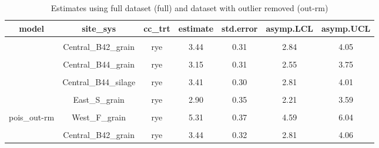 \documentclass[
]{article}
\begin{document}
\begin{table}[H]

\caption{\label{tab:estimates}Estimates using full dataset (full) and dataset with outlier removed (out-rm)}
\centering
\begin{tabular}[t]{ccccccc}
\toprule
model & site\_sys & cc\_trt & estimate & std.error & asymp.LCL & asymp.UCL\\
\midrule
\cellcolor{gray!6}{pois\_out-rm} & \cellcolor{gray!6}{Central\_B42\_grain} & \cellcolor{gray!6}{no} & \cellcolor{gray!6}{2.59} & \cellcolor{gray!6}{0.32} & \cellcolor{gray!6}{1.97} & \cellcolor{gray!6}{3.21}\\
 & \multirow{-2}{*}{\centering\arraybackslash Central\_B42\_grain} & rye & 3.44 & 0.31 & 2.84 & 4.05\\

\cellcolor{gray!6}{pois\_out-rm} & \cellcolor{gray!6}{Central\_B44\_grain} & \cellcolor{gray!6}{no} & \cellcolor{gray!6}{3.33} & \cellcolor{gray!6}{0.31} & \cellcolor{gray!6}{2.73} & \cellcolor{gray!6}{3.93}\\
 & \multirow{-2}{*}{\centering\arraybackslash Central\_B44\_grain} & rye & 3.15 & 0.31 & 2.55 & 3.75\\

\cellcolor{gray!6}{pois\_out-rm} & \cellcolor{gray!6}{Central\_B44\_silage} & \cellcolor{gray!6}{no} & \cellcolor{gray!6}{4.35} & \cellcolor{gray!6}{0.30} & \cellcolor{gray!6}{3.77} & \cellcolor{gray!6}{4.94}\\
 & \multirow{-2}{*}{\centering\arraybackslash Central\_B44\_silage} & rye & 3.41 & 0.30 & 2.81 & 4.01\\

\cellcolor{gray!6}{pois\_out-rm} & \cellcolor{gray!6}{East\_S\_grain} & \cellcolor{gray!6}{no} & \cellcolor{gray!6}{3.33} & \cellcolor{gray!6}{0.34} & \cellcolor{gray!6}{2.65} & \cellcolor{gray!6}{4.00}\\
 & \multirow{-2}{*}{\centering\arraybackslash East\_S\_grain} & rye & 2.90 & 0.35 & 2.21 & 3.59\\

\cellcolor{gray!6}{pois\_out-rm} & \cellcolor{gray!6}{West\_F\_grain} & \cellcolor{gray!6}{no} & \cellcolor{gray!6}{6.02} & \cellcolor{gray!6}{0.33} & \cellcolor{gray!6}{5.38} & \cellcolor{gray!6}{6.66}\\
\multirow{-10}{*}{\centering\arraybackslash pois\_out-rm} & \multirow{-2}{*}{\centering\arraybackslash West\_F\_grain} & rye & 5.31 & 0.37 & 4.59 & 6.04\\
\cmidrule{1-7}
\cellcolor{gray!6}{pois\_full} & \cellcolor{gray!6}{Central\_B42\_grain} & \cellcolor{gray!6}{no} & \cellcolor{gray!6}{2.59} & \cellcolor{gray!6}{0.33} & \cellcolor{gray!6}{1.94} & \cellcolor{gray!6}{3.24}\\
 & \multirow{-2}{*}{\centering\arraybackslash Central\_B42\_grain} & rye & 3.44 & 0.32 & 2.81 & 4.06\\


\end{tabular}
\end{table}
\end{document}
